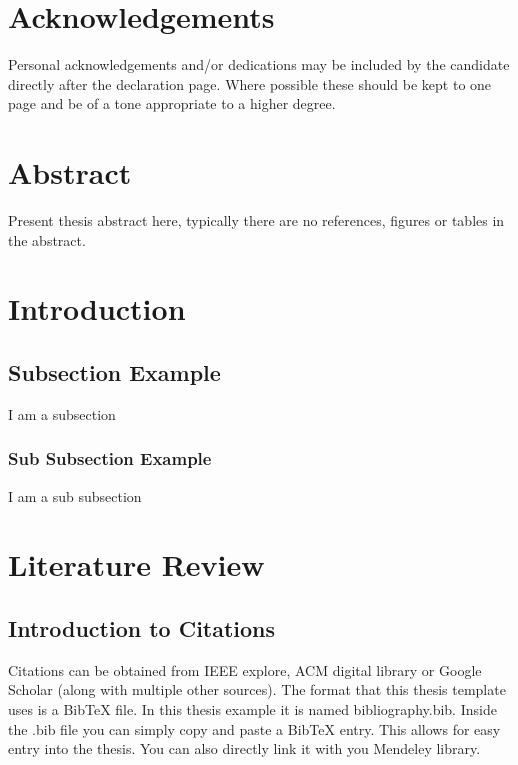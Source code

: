 \documentclass[12pt]{article}
\begin{document}
\section*{Acknowledgements}
Personal acknowledgements and/or dedications may be included by the candidate directly after the declaration page. Where possible these should be kept to one page and be of a tone appropriate to a higher degree.
\pagebreak

\listoffigures
\pagebreak
 
\listoftables
\pagebreak


\tableofcontents
\pagebreak

\section*{Abstract}
Present thesis abstract here, typically there are no references, figures or tables in the abstract.
\pagebreak




\section{Introduction}
\subsection{Subsection Example}
I am a subsection
\subsubsection{Sub Subsection Example}
I am a sub subsection
\pagebreak




\section{Literature Review}
\subsection{Introduction to Citations}
Citations can be obtained from IEEE explore, ACM digital library or Google Scholar (along with multiple other sources). The format that this thesis template uses is a BibTeX file. In this thesis example it is named bibliography.bib. Inside the .bib file you can simply copy and paste a BibTeX entry. This allows for easy entry into the thesis. You can also directly link it with you Mendeley library.
\end{document}

